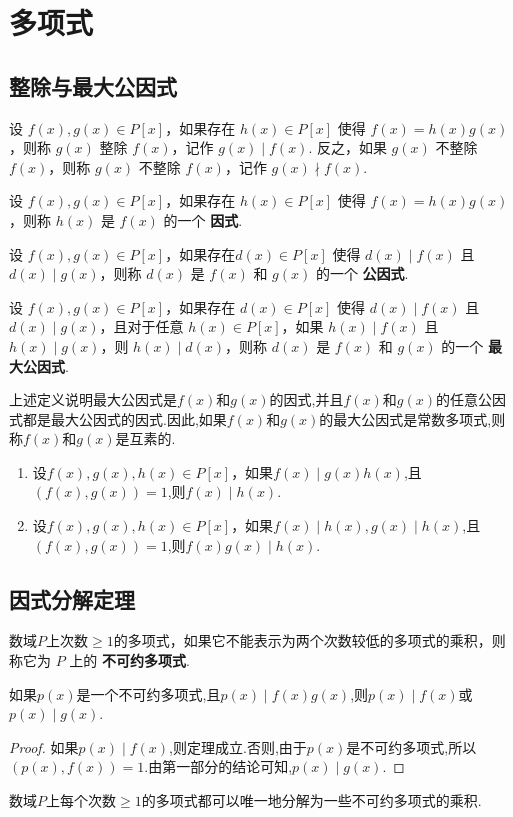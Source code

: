 \chapter{多项式}
\section{整除与最大公因式}
\begin{definition}
    设 $f(x), g(x) \in P[x]$，如果存在 $h(x) \in P[x]$ 使得 $f(x) = h(x)g(x)$，则称 $g(x)$ 整除 $f(x)$，记作 $g(x) \mid f(x)$.
    反之，如果 $g(x)$ 不整除 $f(x)$，则称 $g(x)$ 不整除 $f(x)$，记作 $g(x) \nmid f(x)$.
\end{definition}
\begin{definition}
    设 $f(x), g(x) \in P[x]$，如果存在 $h(x) \in P[x]$ 使得 $f(x) = h(x)g(x)$，则称 $h(x)$ 是 $f(x)$ 的一个 \textbf{因式}.
\end{definition}
\begin{definition}
    设 $f(x), g(x) \in P[x]$，如果存在$d(x)\in P[x]$ 使得 $d(x)\mid f(x)$ 且 $d(x)\mid g(x)$，则称 $d(x)$ 是 $f(x)$ 和 $g(x)$ 的一个 \textbf{公因式}.
\end{definition}
\begin{definition}
    设 $f(x), g(x) \in P[x]$，如果存在 $d(x)\in P[x]$ 使得 $d(x)\mid f(x)$ 且 $d(x)\mid g(x)$，且对于任意 $h(x)\in P[x]$，如果 $h(x)\mid f(x)$ 且 $h(x)\mid g(x)$，则 $h(x)\mid d(x)$，则称 $d(x)$ 是 $f(x)$ 和 $g(x)$ 的一个 \textbf{最大公因式}.
\end{definition}
上述定义说明最大公因式是$f(x)$和$g(x)$的因式,并且$f(x)$和$g(x)$的任意公因式都是最大公因式的因式.因此,如果$f(x)$和$g(x)$的最大公因式是常数多项式,则称$f(x)$和$g(x)$是互素的.
\begin{theorem}
    \begin{enumerate}
        \item 设$f(x), g(x),h(x)\in P[x]$，如果$f(x)\mid g(x)h(x)$,且$(f(x),g(x))=1$,则$f(x)\mid h(x)$.
        \item 设$f(x), g(x),h(x)\in P[x]$，如果$f(x)\mid h(x),g(x)\mid h(x)$,且$(f(x),g(x))=1$,则$f(x)g(x)\mid h(x)$.
    \end{enumerate}
\end{theorem}

\section{因式分解定理}
\begin{definition}
    数域$P$上次数$\geq 1$的多项式，如果它不能表示为两个次数较低的多项式的乘积，则称它为 $P$ 上的 \textbf{不可约多项式}.
\end{definition}
\begin{theorem}
    如果$p(x)$是一个不可约多项式,且$p(x)\mid f(x)g(x)$,则$p(x)\mid f(x)$或$p(x)\mid g(x)$.
\end{theorem}
\begin{proof}
    如果$p(x)\mid f(x)$,则定理成立.否则,由于$p(x)$是不可约多项式,所以$(p(x),f(x))=1$.由第一部分的结论可知,$p(x)\mid g(x)$.
\end{proof}
\begin{theorem}[因式分解定理]
    数域$P$上每个次数$\geq 1$的多项式都可以唯一地分解为一些不可约多项式的乘积.
\end{theorem}

